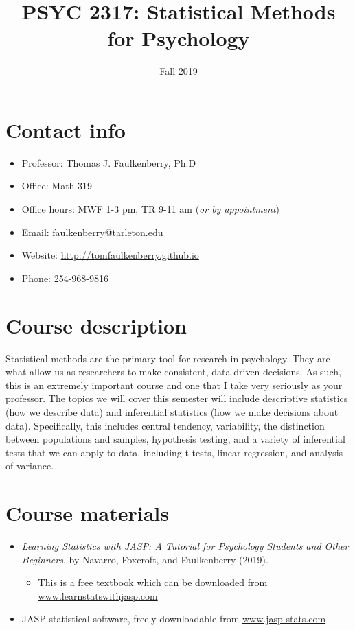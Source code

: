 \documentclass[10pt]{article}
\date{Fall 2019}
\title{PSYC 2317: Statistical Methods for Psychology}
\begin{document}
\maketitle

\section*{Contact info}
\label{sec:org5530f17}
\begin{itemize}
\item Professor: Thomas J. Faulkenberry, Ph.D
\item Office: Math 319
\item Office hours: MWF 1-3 pm, TR 9-11 am (\emph{or by appointment})
\item Email: faulkenberry@tarleton.edu
\item Website: \url{http://tomfaulkenberry.github.io}
\item Phone: 254-968-9816
\end{itemize}

\section*{Course description}
\label{sec:orgbdce5fa}

Statistical methods are the primary tool for research in psychology. They are what allow us as researchers to make consistent, data-driven decisions.  As such, this is an extremely important course and one that I take very seriously as your professor. The topics we will cover this semester will include descriptive statistics (how we describe data) and inferential statistics (how we make decisions about data).  Specifically, this includes central tendency, variability, the distinction between populations and samples, hypothesis testing, and a variety of inferential tests that we can apply to data, including t-tests, linear regression, and analysis of variance.

\section*{Course materials}
\label{sec:org6451cbb}
\begin{itemize}
\item \emph{Learning Statistics with JASP: A Tutorial for Psychology Students and Other Beginners}, by Navarro, Foxcroft, and Faulkenberry (2019). 
\begin{itemize}
\item This is a free textbook which can be downloaded from \href{http://learnstatswithjasp.com}{www.learnstatswithjasp.com}
\end{itemize}
\item JASP statistical software, freely downloadable from \href{http://www.jasp-stats.com}{www.jasp-stats.com}
\end{itemize}
\end{document}
